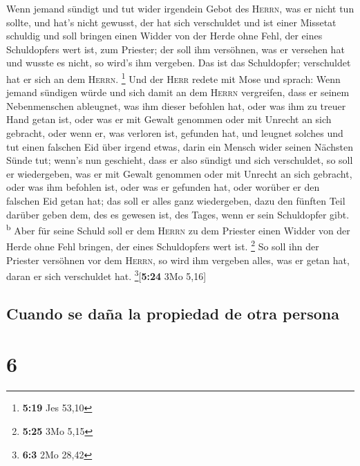  Wenn jemand sündigt und tut wider irgendein Gebot des
\textsc{Herrn}, was er nicht tun sollte, und hat's nicht gewusst, der
hat sich verschuldet und ist einer Missetat schuldig  und
soll bringen einen Widder von der Herde ohne Fehl, der eines
Schuldopfers wert ist, zum Priester; der soll ihm versöhnen, was er
versehen hat und wusste es nicht, so wird's ihm vergeben.
 Das ist das Schuldopfer; verschuldet hat er sich an dem
\textsc{Herrn}. \footnote{\textbf{5:19} Jes 53,10}  Und
der \textsc{Herr} redete mit Mose und sprach:  Wenn
jemand sündigen würde und sich damit an dem \textsc{Herrn} vergreifen,
dass er seinem Nebenmenschen ableugnet, was ihm dieser befohlen hat,
oder was ihm zu treuer Hand getan ist, oder was er mit Gewalt genommen
oder mit Unrecht an sich gebracht,  oder wenn er, was
verloren ist, gefunden hat, und leugnet solches und tut einen falschen
Eid über irgend etwas, darin ein Mensch wider seinen Nächsten Sünde tut;
 wenn's nun geschieht, dass er also sündigt und sich
verschuldet, so soll er wiedergeben, was er mit Gewalt genommen oder mit
Unrecht an sich gebracht, oder was ihm befohlen ist, oder was er
gefunden hat,  oder worüber er den falschen Eid getan
hat; das soll er alles ganz wiedergeben, dazu den fünften Teil darüber
geben dem, des es gewesen ist, des Tages, wenn er sein Schuldopfer gibt.
\textsuperscript{b}  Aber für seine Schuld soll er dem
\textsc{Herrn} zu dem Priester einen Widder von der Herde ohne Fehl
bringen, der eines Schuldopfers wert ist. \footnote{\textbf{5:25} 3Mo
  5,15}  So soll ihn der Priester versöhnen vor dem
\textsc{Herrn}, so wird ihm vergeben alles, was er getan hat, daran er
sich verschuldet hat. \footnote{\textbf{6:3} 2Mo 28,42}{[}\textbf{5:24}
3Mo 5,16{]}

\hypertarget{cuando-se-dauxf1a-la-propiedad-de-otra-persona}{%
\subsection{Cuando se daña la propiedad de otra
persona}\label{cuando-se-dauxf1a-la-propiedad-de-otra-persona}}

\hypertarget{section-5}{%
\section{6}\label{section-5}}

